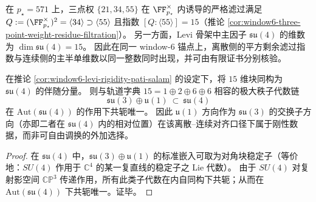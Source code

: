 \begin{remark}[模 \texorpdfstring{$p_\star=571$}{p*=571} 的平方滤过指数与 \texorpdfstring{$\dim\mathfrak{su}(4)$}{dim su4} 的同值性]\label{rem:window6-modpstar-square-filtration-index15-su4}
在 \(p_\star=571\) 上，三点权 \(\{21,34,55\}\) 在 \(\FF_{p_\star}^\times\) 内诱导的严格滤过满足
\(
Q:=(\FF_{p_\star}^\times)^2=\langle 34\rangle\supset \langle 55\rangle
\)
且指数 \([Q:\langle 55\rangle]=15\)（推论 \ref{cor:window6-three-point-weight-residue-filtration}）。
另一方面，Levi 骨架中主因子 \(\mathfrak{su}(4)\) 的维数为 \(\dim\mathfrak{su}(4)=15\)。
因此在同一 window-\(6\) 锚点上，离散侧的平方剩余滤过指数与连续侧的主半单维数以同一整数同时出现，并可由有限证书分别核验。
\end{remark}

\begin{corollary}\label{cor:window6-su4-embedding-rigidity}
在推论 \ref{cor:window6-levi-rigidity-pati-salam} 的设定下，将 \(15\) 维块同构为 \(\mathfrak{su}(4)\) 的伴随分量。
则与轨道字典 \(15=1\oplus 2\oplus 6\oplus 6\) 相容的极大秩子代数链
\[
\mathfrak{su}(3)\oplus\mathfrak u(1)\ \subset\ \mathfrak{su}(4)
\]
在 \(\mathrm{Aut}(\mathfrak{su}(4))\) 的作用下共轭唯一。
因此 \(\mathfrak u(1)\) 方向作为 \(\mathfrak{su}(3)\) 的交换子方向（亦即二者在 \(\mathfrak{su}(4)\) 内的相对位置）在该离散--连续对齐口径下属于刚性数据，而非可自由调换的外加选择。
\end{corollary}
\begin{proof}
在 \(\mathfrak{su}(4)\) 中，\(\mathfrak{su}(3)\oplus\mathfrak u(1)\) 的标准嵌入可取为对角块稳定子（等价地：\(SU(4)\) 作用于 \(\mathbb{C}^4\) 的某一复直线的稳定子之 Lie 代数）。
由于 \(SU(4)\) 对复射影空间 \(\mathbb{CP}^3\) 传递作用，所有此类子代数在内自同构下共轭；从而在 \(\mathrm{Aut}(\mathfrak{su}(4))\) 下共轭唯一。证毕。
\end{proof}

